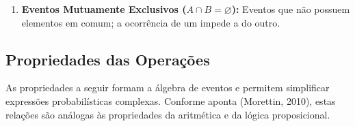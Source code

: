 \begin{enumerate}
\begin{center}
    \end{center}
    \item \textbf{Eventos Mutuamente Exclusivos ($A \cap B = \varnothing$):} Eventos que não possuem elementos em comum; a ocorrência de um impede a do outro.
    \begin{center}
    \end{center}
\end{enumerate}

\newpage
\subsection{Propriedades das Operações}

As propriedades a seguir formam a álgebra de eventos e permitem simplificar expressões probabilísticas complexas. Conforme aponta (Morettin, 2010), estas relações são análogas às propriedades da aritmética e da lógica proposicional.

